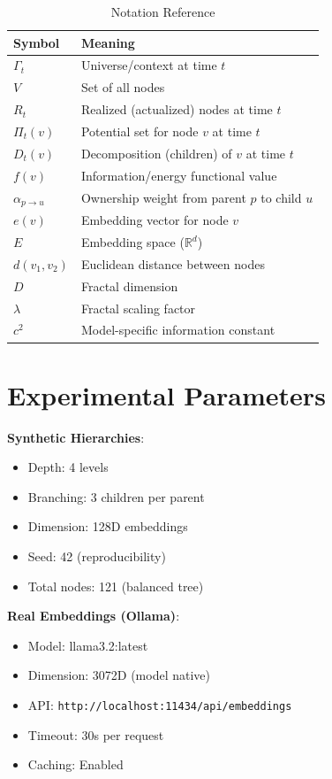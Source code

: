 \documentclass[11pt,a4paper]{article}
\newcommand{\R}{\mathbb{R}}
\newcommand{\Rtd}{\R^d}
\begin{document}
\begin{table}[h]
\centering
\begin{tabular}{ll}
\toprule
\textbf{Symbol} & \textbf{Meaning} \\
\midrule
$\Gamma_t$ & Universe/context at time $t$ \\
$V$ & Set of all nodes \\
$R_t$ & Realized (actualized) nodes at time $t$ \\
$\Pi_t(v)$ & Potential set for node $v$ at time $t$ \\
$D_t(v)$ & Decomposition (children) of $v$ at time $t$ \\
$f(v)$ & Information/energy functional value \\
$\alpha_{p \to u}$ & Ownership weight from parent $p$ to child $u$ \\
$e(v)$ & Embedding vector for node $v$ \\
$E$ & Embedding space ($\Rtd$) \\
$d(v_1, v_2)$ & Euclidean distance between nodes \\
$D$ & Fractal dimension \\
$\lambda$ & Fractal scaling factor \\
$c^2$ & Model-specific information constant \\
\bottomrule
\end{tabular}
\caption{Notation Reference}
\end{table}

\section{Experimental Parameters}

\textbf{Synthetic Hierarchies}:
\begin{itemize}
    \item Depth: 4 levels
    \item Branching: 3 children per parent
    \item Dimension: 128D embeddings
    \item Seed: 42 (reproducibility)
    \item Total nodes: 121 (balanced tree)
\end{itemize}

\textbf{Real Embeddings (Ollama)}:
\begin{itemize}
    \item Model: llama3.2:latest
    \item Dimension: 3072D (model native)
    \item API: \texttt{http://localhost:11434/api/embeddings}
    \item Timeout: 30s per request
    \item Caching: Enabled
\end{itemize}
\end{document}
